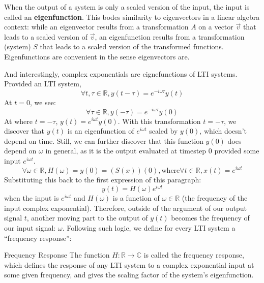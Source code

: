 When the output of a system is only a scaled version of the input, the input is called an \textbf{eigenfunction}.
This bodes similarity to eigenvectors in a linear algebra context: while an eigenvector results from a transformation $A$ on a vector $\vec{v}$ that leads to a scaled version of $\vec{v}$, an eigenfunction results from a transformation (system) $S$ that leads to a scaled version of the transformed functions.
Eigenfunctions are convenient in the sense eigenvectors are.

And interestingly, complex exponentials are eignefunctions of LTI systems.
Provided an LTI system,
\[
    \forall t, \tau \in \mathbb{R}, y(t - \tau) = e^{-i \omega \tau} y(t)
\]
At $t = 0$, we see:
\[
    \forall \tau \in \mathbb{R}, y(-\tau) = e^{-i \omega \tau} y(0)
\]
At where $t = -\tau$, $y(t) = e^{i \omega t} y(0)$.
With this transformation $t = -\tau$, we discover that $y(t)$ is an eigenfunction of $e^{i \omega t}$ scaled by $y(0)$, which doesn't depend on time.
Still, we can further discover that this function $y(0)$ does depend on $\omega$ in general, as it is the output evaluated at timestep $0$ provided some input $e^{i \omega t}$.
\[
    \forall \omega \in \mathbb{R}, H(\omega) = y(0) = (S(x))(0), \text{where} \forall t \in \mathbb{R}, x(t) = e^{i \omega t}
\]
Substituting this back to the first expression of this paragraph:
\[
    y(t) = H(\omega) e^{i \omega t}
\]
when the input is $e^{i \omega t}$ and $H(\omega)$ is a function of $\omega \in \mathbb{R}$ (the frequency of the input complex exponential).
Therefore, outside of the argument of our output signal $t$, another moving part to the output of $y(t)$ becomes the frequency of our input signal: $\omega$.
Following such logic, we define for every LTI system a ``frequency response'':
\begin{ln-define}{Frequency Response}{}
    The function $H: \mathbb{R} \rightarrow \mathbb{C}$ is called the frequency response, which defines the response of any LTI system to a complex exponential input at some given frequency, and gives the scaling factor of the system's eigenfunction.
\end{ln-define}
